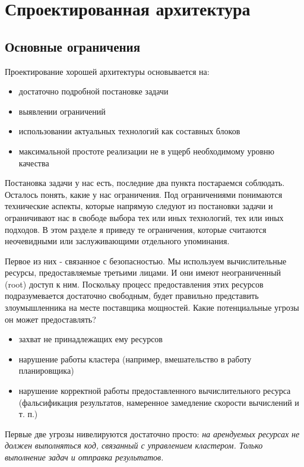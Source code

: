 \chapter{Спроектированная архитектура}

\section{Основные ограничения}

Проектирование хорошей архитектуры основывается на:

\begin{itemize}
	\item достаточно подробной постановке задачи
	\item выявлении ограничений
	\item использовании актуальных технологий как составных блоков
	\item максимальной простоте реализации не в ущерб необходимому уровню качества
\end{itemize}

Постановка задачи у нас есть, последние два пункта постараемся соблюдать. Осталось понять, какие у нас ограничения. Под ограничениями понимаются технические аспекты, которые напрямую следуют из постановки задачи и ограничивают нас в свободе выбора тех или иных технологий, тех или иных подходов. В этом разделе я приведу те ограничения, которые считаются неочевидными или заслуживающими отдельного упоминания.

Первое из них - связанное с безопасностью. Мы используем вычислительные ресурсы, предоставляемые третьими лицами. И они имеют неограниченный (root) доступ к ним. Поскольку процесс предоставления этих ресурсов подразумевается достаточно свободным, будет правильно представить злоумышленника на месте поставщика мощностей. Какие потенциальные угрозы он может предоставлять?

\begin{itemize}
	\item захват не принадлежащих ему ресурсов
	\item нарушение работы кластера (например, вмешательство в работу планировщика)
	\item нарушение корректной работы предоставленного вычислительного ресурса (фальсификация результатов, намеренное замедление скорости вычислений и т. п.)
\end{itemize}

Первые две угрозы нивелируются достаточно просто: \textit{на арендуемых ресурсах не должен выполняться код, связанный с управлением кластером. Только выполнение задач и отправка результатов.}

